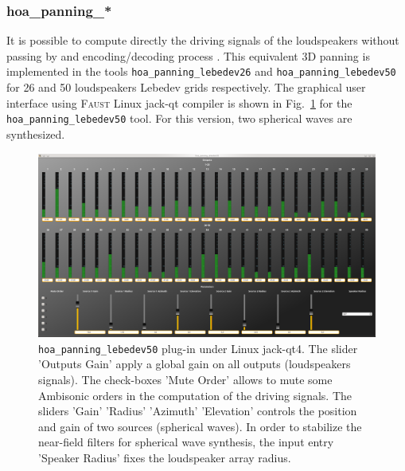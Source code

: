 \documentclass[10pt,a4paper]{article}
\begin{document}
\pagebreak
\subsubsection{hoa\_panning\_*}
\label{section:hoa_panning}
It is possible to compute directly the driving signals of the loudspeakers without passing by and encoding/decoding process \cite{lecomte2015on}. This equivalent 3D panning is implemented in the tools \lstinline'hoa_panning_lebedev26' and \lstinline'hoa_panning_lebedev50' for 26 and 50 loudspeakers Lebedev grids respectively.
The graphical user interface using \textsc{Faust} Linux jack-qt compiler is shown in Fig.~\ref{fig:hoa_panning_lebedev50} for the \lstinline'hoa_panning_lebedev50' tool. For this version, two spherical waves are synthesized.
\begin{figure}[!ht]
\includegraphics[width=\columnwidth]{hoa_panning_lebedev50.png}
\caption{\lstinline'hoa_panning_lebedev50' plug-in under Linux jack-qt4. The slider 'Outputs Gain' apply a global gain on all outputs (loudspeakers signals). The check-boxes 'Mute Order' allows to mute some Ambisonic orders in the computation of the driving signals. The sliders 'Gain' 'Radius' 'Azimuth' 'Elevation' controls the position and gain of two sources (spherical waves). In order to stabilize the near-field filters for spherical wave synthesis, the input entry 'Speaker Radius' fixes the loudspeaker array radius.}
\label{fig:hoa_panning_lebedev50}
\end{figure}

\pagebreak
\end{document}
